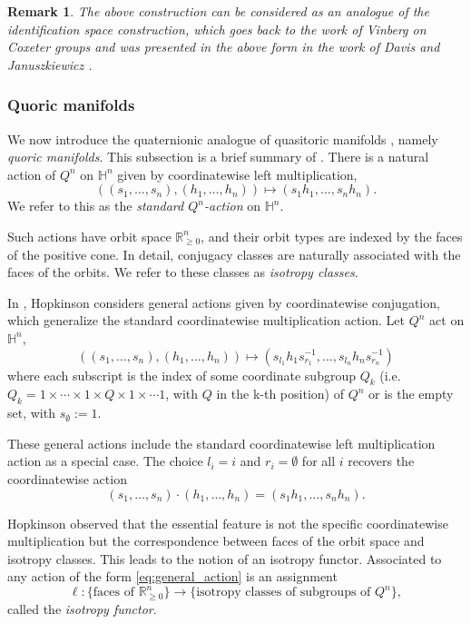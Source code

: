 \documentclass[11pt,a4paper]{article}
\newcommand{\HH}{\ensuremath{\mathbb H}}
\numberwithin{equation}{section}
\newtheorem{remark}[definition]{Remark}
\theoremstyle{named}
\begin{document}
\begin{remark} The above construction can be considered as an analogue of the identification space construction, which goes back to the work of Vinberg \cite{Vinberg} on Coxeter groups and was presented in the above form in the work of Davis and Januszkiewicz \cite{dj}. 
\end{remark}


\subsubsection{Quoric manifolds}
\label{subsec:quoric_manifolds}

We now introduce the quaternionic analogue of quasitoric manifolds \cite{dj}, namely \emph{quoric manifolds}. This subsection is a brief summary of \cite{ho}. There is a natural action of $Q^n$ on $\mathbb H^n$ given by coordinatewise left multiplication,
\[
((s_1,\ldots,s_n),(h_1,\ldots,h_n))
\longmapsto
(s_1h_1,\ldots,s_nh_n).
\]
We refer to this as the \emph{standard $Q^n$-action} on $\mathbb H^n$.

\medskip


Such actions have orbit space \(\mathbb R_{\ge0}^n\), and their orbit types are indexed by the faces of the positive cone. In detail, conjugacy classes are naturally associated with the faces of the orbits. We refer to these classes as \emph{isotropy classes}.

\medskip
In \cite{ho}, Hopkinson considers general actions given by coordinatewise conjugation, which generalize the standard coordinatewise multiplication action. Let $Q^n$ act on $\HH^n$,
\begin{equation} \label{eq:general_action}
((s_1,...,s_n),(h_1,...,h_n))\mapsto (s_{l_1}h_1s_{r_1}^{-1},...,s_{l_n}h_ns_{r_n}^{-1})
\end{equation} 
where each subscript is the index of some coordinate subgroup $Q_k$ (i.e. $Q_k=1\times\cdots\times 1\times Q\times 1\times\cdots 1$, with $Q$ in the k-th position) of $Q^n$ or is the empty set, with $s_{\emptyset}:=1$.

These general actions include the standard coordinatewise left multiplication action as a special case. The choice \(l_i=i\) and \(r_i=\emptyset\) for all $i$ recovers the coordinatewise action
\[
(s_1,\ldots,s_n)\cdot(h_1,\ldots,h_n)=(s_1h_1,\ldots,s_nh_n).
\]

Hopkinson observed that the essential feature is not the specific coordinatewise multiplication but the correspondence between faces of the orbit space and isotropy classes. This leads to the notion of an isotropy functor. Associated to any action of the form \eqref{eq:general_action} is an assignment
\[
\ell: \{\text{faces of }\mathbb R_{\ge0}^n\} \to \{\text{isotropy classes of subgroups of }Q^n\},
\]
called the \emph{isotropy functor}.
\end{document}
